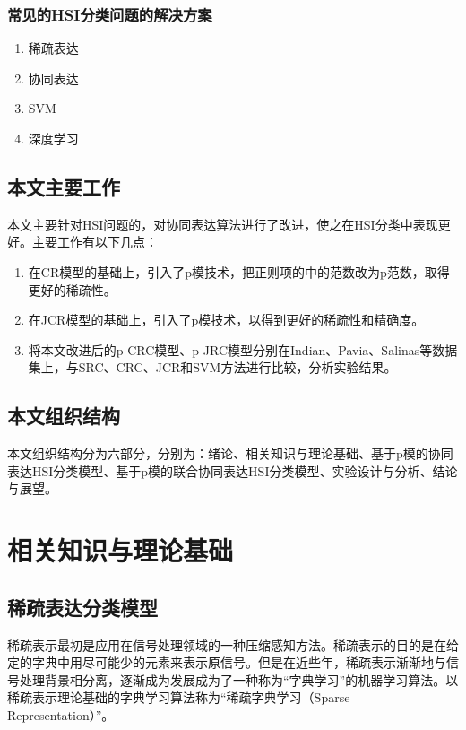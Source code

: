 \documentclass[12pt,a4paper]{article}
\begin{document}
\subsubsection{常见的HSI分类问题的解决方案}
\begin{enumerate}
\item 稀疏表达
\item 协同表达
\item SVM
\item 深度学习
\end{enumerate}


\subsection{本文主要工作}
本文主要针对HSI问题的，对协同表达算法进行了改进，使之在HSI分类中表现更好。主要工作有以下几点：
\begin{enumerate}[(1)]
\item 在CR模型的基础上，引入了p模技术，把正则项的中的范数改为p范数，取得更好的稀疏性。
\item 在JCR模型的基础上，引入了p模技术，以得到更好的稀疏性和精确度。
\item 将本文改进后的p-CRC模型、p-JRC模型分别在Indian、Pavia、Salinas等数据集上，与SRC、CRC、JCR和SVM方法进行比较，分析实验结果。
\end{enumerate}

\subsection{本文组织结构}
本文组织结构分为六部分，分别为：绪论、相关知识与理论基础、基于p模的协同表达HSI分类模型、基于p模的联合协同表达HSI分类模型、实验设计与分析、结论与展望。






\section{相关知识与理论基础}
\subsection{稀疏表达分类模型}
稀疏表示最初是应用在信号处理领域的一种压缩感知方法。稀疏表示的目的是在给定的字典中用尽可能少的元素来表示原信号。但是在近些年，稀疏表示渐渐地与信号处理背景相分离，逐渐成为发展成为了一种称为“字典学习”的机器学习算法。以稀疏表示理论基础的字典学习算法称为“稀疏字典学习（Sparse Representation）”。
\end{document}
